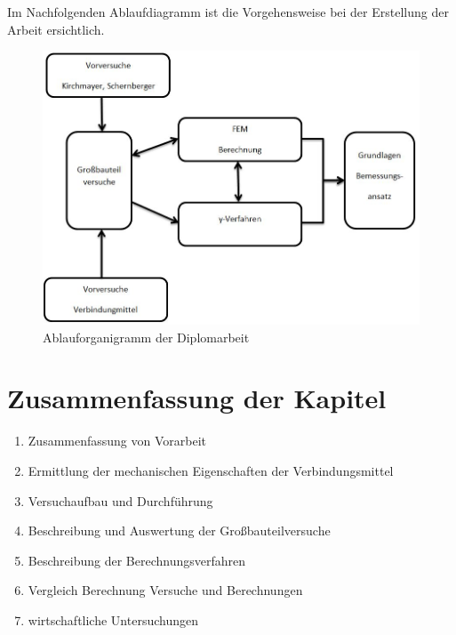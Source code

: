 \newpage{}
Im Nachfolgenden Ablaufdiagramm ist die Vorgehensweise bei der Erstellung der Arbeit ersichtlich.

\begin{figure}[h]
\begin{center}
\includegraphics[scale=0.7]{Einleitung/ablauforganigramm.JPG}
\caption{Ablauforganigramm der Diplomarbeit}
\end{center}
\end{figure}




\section{Zusammenfassung der Kapitel}

\begin{enumerate}
\item Zusammenfassung von Vorarbeit 
\item Ermittlung der mechanischen Eigenschaften der Verbindungsmittel
\item Versuchaufbau und Durchführung
\item Beschreibung und Auswertung der Großbauteilversuche
\item Beschreibung der Berechnungsverfahren
\item Vergleich Berechnung Versuche und Berechnungen
\item wirtschaftliche Untersuchungen

\end{enumerate}